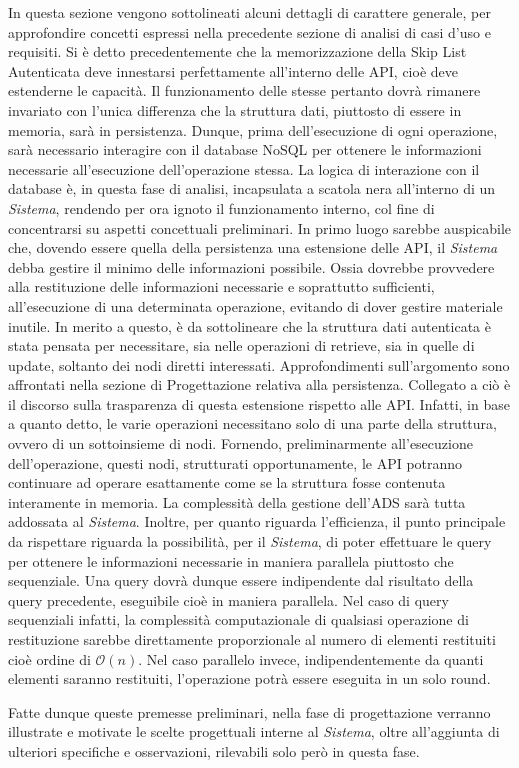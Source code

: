 	In questa sezione vengono sottolineati alcuni dettagli di carattere generale, per approfondire concetti espressi nella precedente sezione di analisi di casi d'uso e requisiti.
	Si è detto precedentemente che la memorizzazione della Skip List Autenticata deve innestarsi perfettamente all'interno delle API, cioè deve estenderne le capacità. Il funzionamento delle stesse pertanto dovrà rimanere invariato con l'unica differenza che la struttura dati, piuttosto di essere in memoria, sarà in persistenza. Dunque, prima dell'esecuzione di ogni operazione, sarà necessario interagire con il database NoSQL per ottenere le informazioni necessarie all'esecuzione dell'operazione stessa. La logica di interazione con il database è, in questa fase di analisi, incapsulata a scatola nera all'interno di un \textit{Sistema}, rendendo per ora ignoto il funzionamento interno, col fine di concentrarsi su aspetti concettuali preliminari.
	In primo luogo sarebbe auspicabile che, dovendo essere quella della persistenza una estensione delle API, il \textit{Sistema} debba gestire il minimo delle informazioni possibile. Ossia dovrebbe provvedere alla restituzione delle informazioni necessarie e soprattutto sufficienti, all'esecuzione di una determinata operazione, evitando di dover gestire materiale inutile. In merito a questo, è da sottolineare che la struttura dati autenticata è stata pensata per necessitare, sia nelle operazioni di retrieve, sia in quelle di update, soltanto dei nodi diretti interessati. Approfondimenti sull'argomento sono affrontati nella sezione di Progettazione relativa alla persistenza.
	Collegato a ciò è il discorso sulla trasparenza di questa estensione rispetto alle API. Infatti, in base a quanto detto, le varie operazioni necessitano solo di una parte della struttura, ovvero di un sottoinsieme di nodi. Fornendo, preliminarmente all'esecuzione dell'operazione, questi nodi, strutturati opportunamente, le API potranno continuare ad operare esattamente come se la struttura fosse contenuta interamente in memoria. La complessità della gestione dell'ADS sarà tutta addossata al \textit{Sistema}.
	Inoltre, per quanto riguarda l'efficienza, il punto principale da rispettare riguarda la possibilità, per il \textit{Sistema}, di poter effettuare le query per ottenere le informazioni necessarie in maniera parallela piuttosto che sequenziale. Una query dovrà dunque essere indipendente dal risultato della query precedente, eseguibile cioè in maniera parallela. Nel caso di query sequenziali infatti, la complessità computazionale di qualsiasi operazione di restituzione sarebbe direttamente proporzionale al numero di elementi restituiti cioè ordine di $\mathcal{O}(n)$. Nel caso parallelo invece, indipendentemente da quanti elementi saranno restituiti, l'operazione potrà essere eseguita in un solo round.
	
	Fatte dunque queste premesse preliminari, nella fase di progettazione verranno illustrate e motivate le scelte progettuali interne al \textit{Sistema}, oltre all'aggiunta di ulteriori specifiche e osservazioni, rilevabili solo però in questa fase.
	
